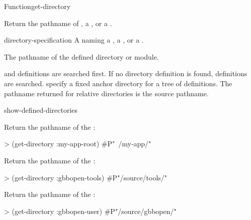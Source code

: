 \documentclass[10pt,twoside,english,pdftex]{article}
\begin{document}
\begin{functiondoc}{Function}{get-directory}{
    \returns{} }
%

\fnsyntax 

\fnpurpose Return the pathname of , a
, or a .

\fnpackage {}

\fnmodule {}

\fnargs
\begin{args}{directory-specification}
\arg[name] A  naming a , a
, or a .
\end{args}

\fnreturns The pathname of the defined directory or module.

\fnerrors
\relativedircircularity

\fndescription {} and  definitions are
searched first.  If no  directory definition is found,
 definitions are searched.   specify a
fixed anchor directory for a tree of  definitions.
The pathname returned for relative directories is the source pathname.

\begin{alsos}{show-defined-directories}
\end{alsos}

\fnexamples

Return the pathname of the  :
%
\W\supp
\begin{example}
> (get-directory :my-app-root)
#P"~/my-app/"
\end{example}
%
Return the pathname of the  :
%
\W\supp\notpretop
\begin{example}
> (get-directory :gbbopen-tools)
#P"/source/tools/"
\end{example}
%
Return the pathname of the  :
%
\W\supp\notpretop
\begin{example}
> (get-directory :gbbopen-user)
#P"/source/gbbopen/"
\end{example}

\end{functiondoc}
\end{document}

